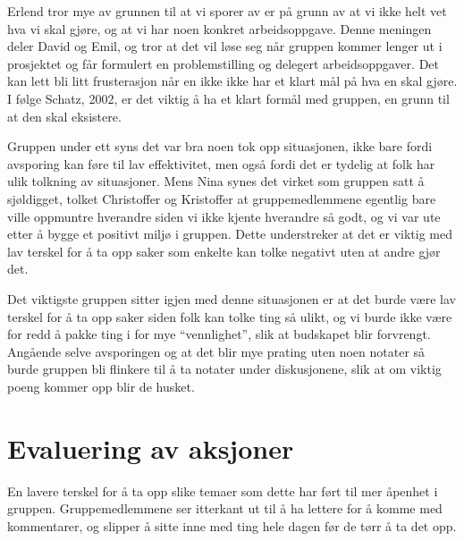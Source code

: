Erlend tror mye av grunnen til at vi sporer av er på grunn av at vi ikke helt vet hva vi skal gjøre, og at vi har noen konkret 
arbeidsoppgave. Denne meningen deler David og Emil, og tror at det vil løse seg når gruppen kommer lenger ut i prosjektet og får 
formulert en problemstilling og delegert arbeidsoppgaver. Det kan lett bli litt frusterasjon når en ikke ikke har et klart mål på hva en 
skal gjøre. I følge Schatz, 2002, er det viktig å ha et klart formål med gruppen, en grunn til at den skal eksistere.

Gruppen under ett syns det var bra noen tok opp situasjonen, ikke bare fordi avsporing kan føre til lav effektivitet, men også fordi det 
er tydelig at folk har ulik tolkning av situasjoner. Mens Nina synes det virket som gruppen satt å sjøldigget, tolket Christoffer og 
Kristoffer at gruppemedlemmene egentlig bare ville oppmuntre hverandre siden vi ikke kjente hverandre så godt, og vi var ute etter å 
bygge et positivt miljø i gruppen. Dette understreker at det er viktig med lav terskel for å ta opp saker som enkelte kan tolke negativt 
uten at andre gjør det.

Det viktigste gruppen sitter igjen med denne situasjonen er at det burde være lav terskel for å ta opp saker siden folk kan tolke ting så 
ulikt, og vi burde ikke være for redd å pakke ting i for mye ``vennlighet'', slik at budskapet blir forvrengt. Angående selve avsporingen 
og at det blir mye prating uten noen notater så burde gruppen bli flinkere til å ta notater under diskusjonene, slik at om viktig poeng 
kommer opp blir de husket.

\section{Evaluering av aksjoner}
En lavere terskel for å ta opp slike temaer som dette har ført til mer åpenhet i gruppen. Gruppemedlemmene ser itterkant ut til å ha lettere for å komme med kommentarer, og slipper å sitte inne med ting hele dagen før de tørr å ta det opp.


